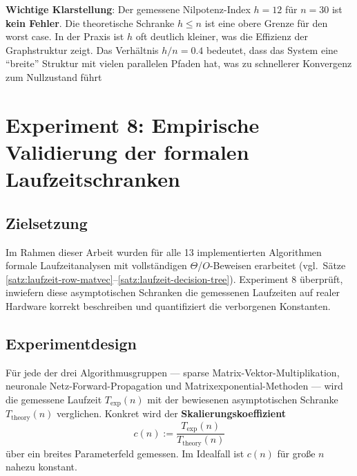 \documentclass[a4paper,12pt]{report}
\theoremstyle{definition}
\begin{document}
	\textbf{Wichtige Klarstellung}: Der gemessene Nilpotenz-Index $h = 12$ für $n = 30$ ist \textbf{kein Fehler}. Die theoretische Schranke $h \leq n$ ist eine obere Grenze für den worst case. In der Praxis ist $h$ oft deutlich kleiner, was die Effizienz der Graphstruktur zeigt. Das Verhältnis $h/n = 0.4$ bedeutet, dass das System eine ``breite'' Struktur mit vielen parallelen Pfaden hat, was zu schnellerer Konvergenz zum Nullzustand führt
	
	\section{Experiment 8: Empirische Validierung der formalen Laufzeitschranken}

	\subsection{Zielsetzung}

	Im Rahmen dieser Arbeit wurden für alle 13 implementierten Algorithmen formale Laufzeitanalysen mit vollständigen $\Theta$/$O$-Beweisen erarbeitet (vgl.\ Sätze \ref{satz:laufzeit-row-matvec}--\ref{satz:laufzeit-decision-tree}). Experiment 8 überprüft, inwiefern diese asymptotischen Schranken die gemessenen Laufzeiten auf realer Hardware korrekt beschreiben und quantifiziert die verborgenen Konstanten.

	\subsection{Experimentdesign}

	Für jede der drei Algorithmusgruppen — sparse Matrix-Vektor-Multiplikation, neuronale Netz-Forward-Propagation und Matrixexponential-Methoden — wird die gemessene Laufzeit $T_{\mathrm{exp}}(n)$ mit der bewiesenen asymptotischen Schranke $T_{\mathrm{theory}}(n)$ verglichen. Konkret wird der \textbf{Skalierungskoeffizient}
	\[
		c(n) := \frac{T_{\mathrm{exp}}(n)}{T_{\mathrm{theory}}(n)}
	\]
	über ein breites Parameterfeld gemessen. Im Idealfall ist $c(n)$ für große $n$ nahezu konstant.
\end{document}

